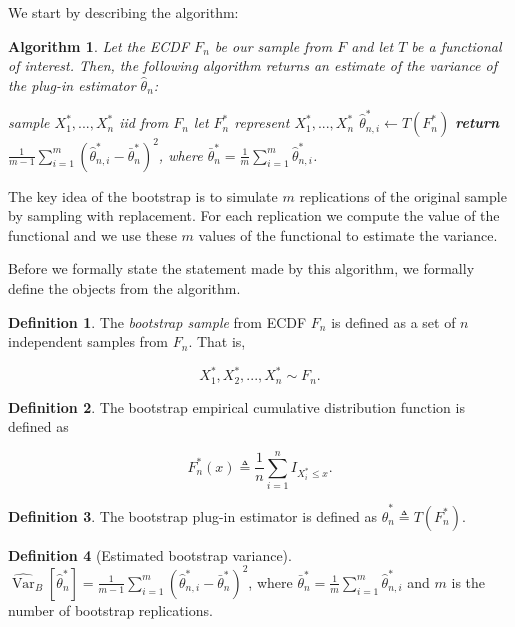 \documentclass{book}
\theoremstyle{plain}%
\newtheorem{algo}{Algorithm}[section]
\theoremstyle{definition}
\newtheorem{definition}{Definition}[section]
\DeclareMathOperator{\Var}{Var}
\begin{document}
We start by describing the algorithm:

\begin{algo}
Let the ECDF $F_n$ be our sample from $F$ and let $T$ be a functional of interest. Then, the following algorithm returns an estimate of the variance of the plug-in estimator $\hat{\theta}_n$:
\begin{algorithmic}[1]
     
\State sample $X^*_{1},..., X^*_{n}$ iid from $F_n$ 
\State let $F^*_{n}$ represent $X^*_{1},..., X^*_{n}$
                \State $\hat{\theta}^*_{n,i} \gets T(F^*_{n})$
              \EndFor
              \State \textbf{return} $\frac{1}{m - 1} \sum_{i=1}^m \left(\hat{\theta}^*_{n,i} - \bar{\theta}^*_n\right)^2$, where $\bar{\theta}^*_n = \frac{1}{m} \sum_{i=1}^m \hat{\theta}^*_{n,i}$.
        \EndProcedure
    \end{algorithmic}\label{alg:bootstrap}
\end{algo}

The key idea of the bootstrap is to simulate $m$ replications of the original sample by sampling with replacement. For each replication we compute the value of the functional and we use these $m$ values of the functional to estimate the variance.

Before we formally state the statement made by this algorithm, we formally define the objects from the algorithm.

\begin{definition} The \textit{bootstrap sample} from ECDF $F_n$ is defined as a set of $n$ independent samples from $F_n$. That is, 

$$X_1^*, X_2^*,...,X_n^* \sim F_n.$$ 
\end{definition}


\begin{definition} The bootstrap empirical cumulative distribution function is defined as

$$F^*_n(x) \triangleq \frac{1}{n}\sum_{i=1}^n I_{X^*_i \leq x}.$$
\end{definition}

\begin{definition}
The bootstrap plug-in estimator is defined as $\hat{\theta}^*_n \triangleq T(F^*_n)$.
\end{definition}

\begin{definition}[Estimated bootstrap variance]
$\widehat{\Var}_B[\hat{\theta}^*_n] = \frac{1}{m - 1} \sum_{i=1}^m \left(\hat{\theta}^*_{n,i} - \bar{\theta}^*_n\right)^2$, where $\bar{\theta}^*_n = \frac{1}{m} \sum_{i=1}^m \hat{\theta}^*_{n,i}$ and $m$ is the number of bootstrap replications.
\end{definition}
\end{document}
